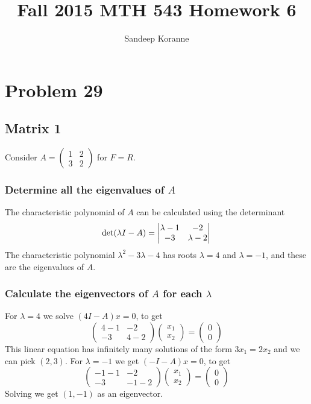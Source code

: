 \documentclass{article}[12pt]
\begin{document}
\title{Fall 2015 MTH 543 Homework 6}
\author{Sandeep Koranne}
\maketitle

\section{Problem 29}
\subsection{Matrix 1}
Consider $A=\begin{pmatrix} 1 & 2 \\ 3 & 2 \end{pmatrix}$ for $F=R$.
\subsubsection{Determine all the eigenvalues of $A$}
The characteristic polynomial of $A$ can be calculated using the determinant 
\[
\textrm{det}(\lambda I-A) = \begin{vmatrix} \lambda-1 & -2 \\ -3 & \lambda-2 \end{vmatrix} \\
\]
The characteristic polynomial $\lambda^2-3\lambda-4$ has 
roots $\lambda=4$ and $\lambda=-1$, and these
are the eigenvalues of $A$. 

\subsubsection{Calculate the eigenvectors of $A$ for each $\lambda$}
For $\lambda=4$ we solve
$(4I-A)x=0$, to get
\[
\begin{pmatrix}
4-1 & -2 \\
-3 & 4-2
\end{pmatrix} \begin{pmatrix} x_1 \\ x_2 \end{pmatrix} = 
\begin{pmatrix} 0 \\ 0
\end{pmatrix}
\]
This linear equation has infinitely many solutions 
of the form $3x_1=2x_2$ and we can pick $(2,3)$.
For $\lambda=-1$ we get $(-I-A)x=0$, to get
\[
\begin{pmatrix}
-1-1 & -2 \\
-3 & -1-2
\end{pmatrix} \begin{pmatrix} x_1 \\ x_2 \end{pmatrix} = 
\begin{pmatrix} 0 \\ 0
\end{pmatrix}
\]
Solving we get $(1,-1)$ as an eigenvector.
\end{document}
